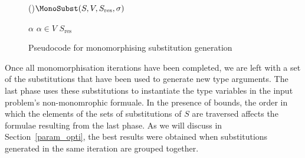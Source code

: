 \documentclass[runningheads]{llncs}
\begin{document}
\begin{figure}[t!]
   \begin{algorithm}[H]


   \Fn(){\(\MonoSubst(S, V, S_{\text{res}}, \sigma)\)}{


   \BlankLine

   \eIf{\(V = \emptyset\)}{
    \Return \(S_{\text{res}}\cup\{\sigma\}\)\;%
   }
   {
      \Let \(\alpha \) \ST \(\alpha\in V\)\;
      \Return \(S_{\text{res}}\)\;
   }
   }


\end{algorithm}
\caption{Pseudocode for monomorphising substitution generation}
\label{mono_substs}
\end{figure}

Once all monomorphisation iterations have been completed, we are left with a set of the substitutions that have been used to generate new type arguments. The last phase uses these substitutions to instantiate the type variables in the input problem's non-monomrophic formuale. In the presence of bounds, the order in which the elements of the sets of substitutions of \(S\) are traversed affects the formulae resulting from the last phase. As we will discuss in Section~\ref{param_opti}, the best results were obtained when substitutions generated in the same iteration are grouped together.
\end{document}
